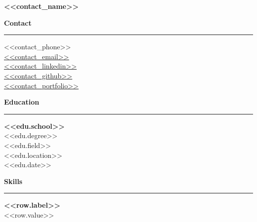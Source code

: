 \documentclass[10pt]{article}
\newcommand{\cvsection}[1]{
  \vspace{6pt}
  {\large\bf #1}
  \vspace{2pt}
  \hrule
  \vspace{5pt}
}
\newcommand{\tagged}[2]{\hypertarget{#1}{#2}}
\begin{document}
\noindent
{}
\vspace{-0.5cm}
\begin{center}
  {\LARGE\bf\color{white} \tagged{contact_name}{<<contact_name>>}}
\end{center}
\vspace{0.4cm}

\noindent
\begin{minipage}[t]{0.28\textwidth}
\vspace{0pt}
\hspace{6pt}
\begin{minipage}[t]{\dimexpr\textwidth-6pt}

\cvsection{Contact}
{\fontsize{8.5}{12}\selectfont
\tagged{contact_phone}{<<contact_phone>>} \\[2pt]
\underline{\href{mailto:<<contact_email_raw>>}{\tagged{contact_email}{<<contact_email>>}}} \\[2pt]
\underline{\href{<<contact_linkedin_url>>}{\tagged{contact_linkedin}{<<contact_linkedin>>}}} \\[2pt]
\underline{\href{<<contact_github_url>>}{\tagged{contact_github}{<<contact_github>>}}} \\[2pt]
\underline{\href{<<contact_portfolio_url>>}{\tagged{contact_portfolio}{<<contact_portfolio>>}}}
}

\cvsection{Education}
{\fontsize{9.5}{13}\bf \tagged{<<edu.id>>_school}{<<edu.school>>}} \\[2pt]
{\fontsize{8.5}{11}\selectfont \tagged{<<edu.id>>_degree}{<<edu.degree>>}} \\[2pt]
{\fontsize{8}{10}\selectfont \tagged{<<edu.id>>_field}{<<edu.field>>}} \\[2pt]
{\fontsize{8}{10}\selectfont \tagged{<<edu.id>>_location}{<<edu.location>>}} \\[2pt]
{\fontsize{8}{10}\selectfont \tagged{<<edu.id>>_date}{<<edu.date>>}}
\vspace{6pt}

\cvsection{Skills}
{\fontsize{8}{12}\selectfont
{\bf \tagged{<<row.id>>_label}{<<row.label>>}} \\[1pt]
\tagged{<<row.id>>_value}{<<row.value>>}
\vspace{5pt}
}

\end{minipage}
\end{minipage}%
\end{document}
